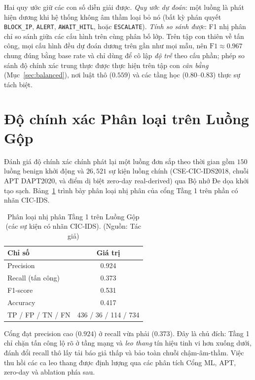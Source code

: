 Hai quy ước giữ các con số diễn giải được. \emph{Quy ước dự đoán}: một luồng là phát hiện dương khi hệ thống không âm thầm loại bỏ nó (bất kỳ phán quyết \texttt{BLOCK\_IP}, \texttt{ALERT}, \texttt{AWAIT\_HITL}, hoặc \texttt{ESCALATE}). \emph{Tính so sánh được}: F1 nhị phân chỉ so sánh giữa các cấu hình trên cùng phân bố lớp. Trên tập con thiên về tấn công, mọi cấu hình đều dự đoán dương trên gần như mọi mẫu, nên $\mathrm{F1}\!\approx\!0.967$ chung đúng bằng base rate và chỉ dùng để cô lập \emph{độ trễ} theo cấu phần; phép so sánh độ chính xác trung thực được thực hiện trên tập con \emph{cân bằng} (Mục~\ref{sec:balanced}), nơi luật thô ($0.559$) và các tầng học ($0.80$--$0.83$) thực sự tách biệt.

\section{Độ chính xác Phân loại trên Luồng Gộp}
Đánh giá độ chính xác chính phát lại một luồng đơn sắp theo thời gian gồm $150$ luồng benign khởi động và $26{,}521$ sự kiện luồng chính (CSE-CIC-IDS2018, chuỗi APT DAPT2020, và điểm dị biệt zero-day real-derived) qua Bộ nhớ Đe dọa khởi tạo sạch. Bảng~\ref{tab:classification} trình bày phân loại nhị phân của cổng Tầng 1 trên phần có nhãn CIC-IDS.

\begin{table}[!htbp]
    \centering
    \caption{Phân loại nhị phân Tầng 1 trên Luồng Gộp (các sự kiện có nhãn CIC-IDS). (Nguồn: Tác giả)}
    \label{tab:classification}
    \begin{tabular}{|l|c|}
        \hline
        \textbf{Chỉ số} & \textbf{Giá trị} \\ \hline
        Precision & 0.924 \\ \hline
        Recall (tấn công) & 0.373 \\ \hline
        F1-score & 0.531 \\ \hline
        Accuracy & 0.417 \\ \hline
        TP / FP / TN / FN & 436 / 36 / 114 / 734 \\ \hline
    \end{tabular}
\end{table}

Cổng đạt precision cao ($0.924$) ở recall vừa phải ($0.373$). Đây là chủ đích: Tầng 1 chỉ chặn tấn công lộ rõ ở tầng mạng và \emph{leo thang} tín hiệu tinh vi hơn xuống dưới, đánh đổi recall thô lấy tải báo giả thấp và bảo toàn chuỗi chậm-âm-thầm. Việc thu hồi các ca leo thang được định lượng qua các phân tích Cổng ML, APT, zero-day và ablation phía sau.

